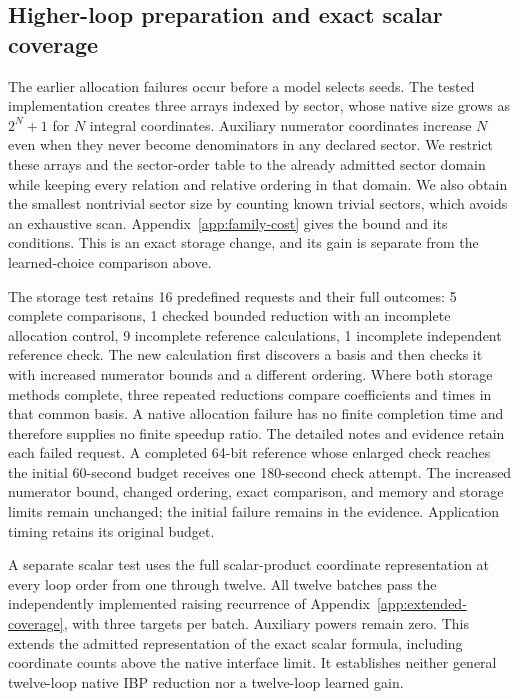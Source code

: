 \subsection{Higher-loop preparation and exact scalar coverage}
The earlier allocation failures occur before a model selects seeds. The tested implementation creates three arrays indexed by sector, whose native size grows as $2^N+1$ for $N$ integral coordinates. Auxiliary numerator coordinates increase $N$ even when they never become denominators in any declared sector. We restrict these arrays and the sector-order table to the already admitted sector domain while keeping every relation and relative ordering in that domain. We also obtain the smallest nontrivial sector size by counting known trivial sectors, which avoids an exhaustive scan. Appendix~\ref{app:family-cost} gives the bound and its conditions. This is an exact storage change, and its gain is separate from the learned-choice comparison above.

The storage test retains 16 predefined requests and their full outcomes: 5 complete comparisons, 1 checked bounded reduction with an incomplete allocation control, 9 incomplete reference calculations, 1 incomplete independent reference check. The new calculation first discovers a basis and then checks it with increased numerator bounds and a different ordering. Where both storage methods complete, three repeated reductions compare coefficients and times in that common basis. A native allocation failure has no finite completion time and therefore supplies no finite speedup ratio. The detailed notes and evidence retain each failed request. A completed 64-bit reference whose enlarged check reaches the initial 60-second budget receives one 180-second check attempt. The increased numerator bound, changed ordering, exact comparison, and memory and storage limits remain unchanged; the initial failure remains in the evidence. Application timing retains its original budget.

A separate scalar test uses the full scalar-product coordinate representation at every loop order from one through twelve. All twelve batches pass the independently implemented raising recurrence of Appendix~\ref{app:extended-coverage}, with three targets per batch. Auxiliary powers remain zero. This extends the admitted representation of the exact scalar formula, including coordinate counts above the native interface limit. It establishes neither general twelve-loop native IBP reduction nor a twelve-loop learned gain.

